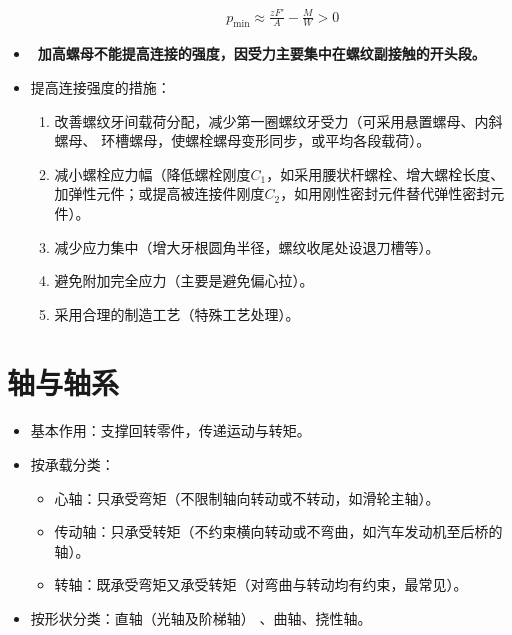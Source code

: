 \documentclass[12pt,a4paper]{article}
\newcommand{\tightlist}{\setlength{\parskip}{0pt}\setlength{\itemsep}{0pt}}
\newcommand{\hint}[1]{\textsf{（#1）}}
\newcommand{\minor}[1]{{\color{gray} #1}}
\renewcommand{\emph}[1]{\faIcon[regular]{lightbulb}\ \textbf{#1}}
\begin{document}
\begin{itemize}
\begin{itemize}
{\begin{gather}
        p_{\min}\approx\frac{zF'}{A}-\frac{M}{W}>0
        \end{gather}}
    \end{itemize}
    \item \emph{加高螺母不能提高连接的强度，因受力主要集中在螺纹副接触的开头段。}
    \item 提高连接强度的措施：
    \begin{enumerate}\tightlist
        \item 改善螺纹牙间载荷分配，减少第一圈螺纹牙受力\hint{可采用悬置螺母、内斜螺母、
        环槽螺母，使螺栓螺母变形同步，或平均各段载荷}。
        \item 减小螺栓应力幅\hint{降低螺栓刚度$C_1$，如采用腰状杆螺栓、增大螺栓长度、
        加弹性元件；或提高被连接件刚度$C_2$，如用刚性密封元件替代弹性密封元件}。
        \item 减少应力集中\hint{增大牙根圆角半径，螺纹收尾处设退刀槽等}。
        \item 避免附加完全应力\hint{主要是避免偏心拉}。
        \item 采用合理的制造工艺\hint{特殊工艺处理}。
    \end{enumerate}
\end{itemize}

\section{轴与轴系}
\begin{itemize}\tightlist
    \item 基本作用：支撑回转零件，传递运动与转矩。
    \item 按承载分类：
    \begin{itemize}\tightlist
        \item 心轴：只承受弯矩\hint{不限制轴向转动或不转动，如滑轮主轴}。
        \item 传动轴：只承受转矩\hint{不约束横向转动或不弯曲，如汽车发动机至后桥的轴}。
        \item 转轴：既承受弯矩又承受转矩\hint{对弯曲与转动均有约束，最常见}。
    \end{itemize}
    \item 按形状分类：直轴\hint{光轴及阶梯轴}\minor{、曲轴、挠性轴}。
\end{itemize}
\end{document}
